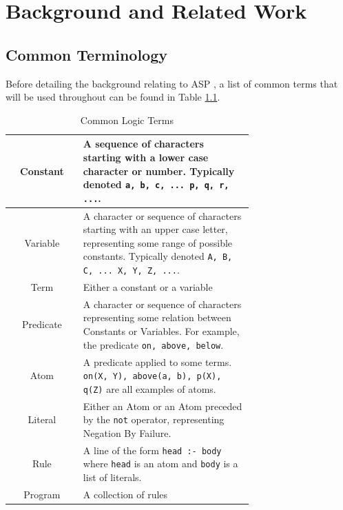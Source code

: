 \chapter{Background and Related Work}

\section{Common Terminology}
Before detailing the background relating to ASP \cite{Lifschitz1999}, a list of common terms that will be used throughout can be found in Table \ref{table:4}.

\begin{table}[h!]
\centering
\makeatletter
\@fpsep\textheight
\makeatother
\begin{tabular}{| c | m{0.7\linewidth} |}
\hline
Constant & 
\mbox{}\newline
A sequence of characters starting with a lower case character or number. Typically denoted \lstinline!a, b, c, ... p, q, r, ...!. \newline
\\
\hline
Variable & 
\mbox{}\newline
A character or sequence of characters starting with an upper case letter, representing some range of possible constants. Typically denoted \lstinline!A, B, C, ... X, Y, Z, ...!.\newline
\\
\hline
Term &
\mbox{}\newline
Either a constant or a variable \newline
\\
\hline
Predicate &
\mbox{}\newline
A character or sequence of characters representing some relation between Constants or Variables. For example, the predicate \lstinline!on, above, below!. \newline
 \\
\hline
Atom &
\mbox{}\newline
A predicate applied to some terms. \lstinline!on(X, Y), above(a, b), p(X), q(Z)! are all examples of atoms.\newline
 \\
\hline
Literal & 
\mbox{}\newline
Either an Atom or an Atom preceded by the \lstinline!not! operator, representing Negation By Failure. \newline
\\
\hline
Rule & 
\mbox{}\newline
A line of the form \lstinline!head :- body! where \lstinline!head! is an atom and \lstinline!body! is a list of literals.
\newline
 \\
\hline
Program &
\mbox{}\newline
A collection of rules \newline
\\
\hline
\end{tabular}
\caption{Common Logic Terms \cite{Muggleton1991}}
\label{table:4}
\clearpage
\end{table}

